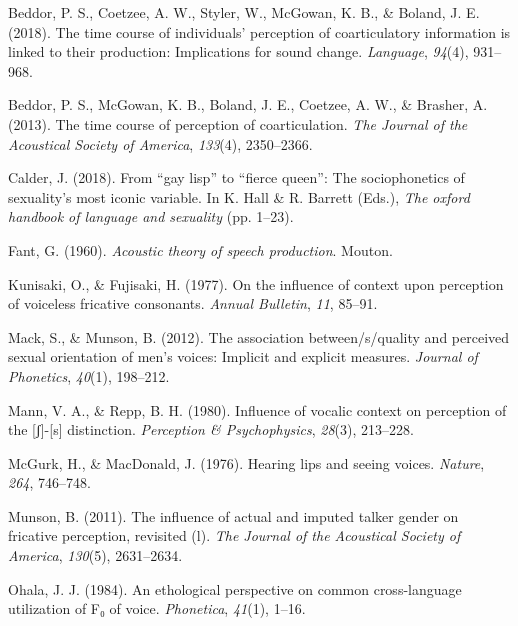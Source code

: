\documentclass[
  man,
  longtable,
  nolmodern,
  notxfonts,
  notimes,
  colorlinks=true,linkcolor=blue,citecolor=blue,urlcolor=blue]{apa7}
\newlength{\cslhangindent}
\newenvironment{CSLReferences}[2] %
 {\begin{list}{}{%
  \setlength{\itemindent}{0pt}
  \setlength{\leftmargin}{0pt}
  \setlength{\parsep}{0pt}
  \ifodd #1
   \setlength{\leftmargin}{\cslhangindent}
   \setlength{\itemindent}{-1\cslhangindent}
  \fi
  \setlength{\itemsep}{#2\baselineskip}}}
 {\end{list}}
\begin{document}
\label{refs}
\begin{CSLReferences}{1}{0}
Beddor, P. S., Coetzee, A. W., Styler, W., McGowan, K. B., \& Boland, J.
E. (2018). The time course of individuals' perception of coarticulatory
information is linked to their production: Implications for sound
change. \emph{Language}, \emph{94}(4), 931--968.

Beddor, P. S., McGowan, K. B., Boland, J. E., Coetzee, A. W., \&
Brasher, A. (2013). The time course of perception of coarticulation.
\emph{The Journal of the Acoustical Society of America}, \emph{133}(4),
2350--2366.

Calder, J. (2018). From {``gay lisp''} to {``fierce queen''}: The
sociophonetics of sexuality's most iconic variable. In K. Hall \& R.
Barrett (Eds.), \emph{The oxford handbook of language and sexuality}
(pp. 1--23).

Fant, G. (1960). \emph{Acoustic theory of speech production}. Mouton.

Kunisaki, O., \& Fujisaki, H. (1977). On the influence of context upon
perception of voiceless fricative consonants. \emph{Annual Bulletin},
\emph{11}, 85--91.

Mack, S., \& Munson, B. (2012). The association between/s/quality and
perceived sexual orientation of men's voices: Implicit and explicit
measures. \emph{Journal of Phonetics}, \emph{40}(1), 198--212.

Mann, V. A., \& Repp, B. H. (1980). Influence of vocalic context on
perception of the {[}ʃ{]}-{[}s{]} distinction. \emph{Perception \&
Psychophysics}, \emph{28}(3), 213--228.

McGurk, H., \& MacDonald, J. (1976). Hearing lips and seeing voices.
\emph{Nature}, \emph{264}, 746--748.

Munson, B. (2011). The influence of actual and imputed talker gender on
fricative perception, revisited (l). \emph{The Journal of the Acoustical
Society of America}, \emph{130}(5), 2631--2634.

Ohala, J. J. (1984). An ethological perspective on common cross-language
utilization of F₀ of voice. \emph{Phonetica}, \emph{41}(1), 1--16.


\end{CSLReferences}
\end{document}
